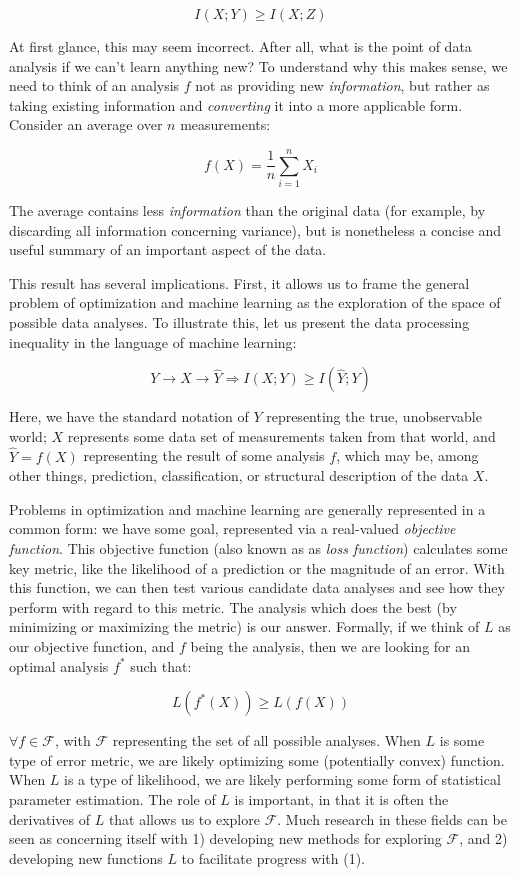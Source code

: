 \documentclass[12pt]{book}
\begin{document}
\[
I(X; Y) \geq I(X; Z)
\]

At first glance, this may seem incorrect.
After all, what is the point of data analysis if we can't learn anything new?
To understand why this makes sense, we need to think of an analysis $f$ not as providing new \textit{information}, but rather as taking existing information and \textit{converting} it into a more applicable form.
Consider an average over $n$ measurements:

\[
f(X) = \frac{1}{n} \sum_{i=1}^n X_i
\]

The average contains less \textit{information} than the original data (for example, by discarding all information concerning variance), but is nonetheless a concise and useful summary of an important aspect of the data.

\bigskip

This result has several implications.
First, it allows us to frame the general problem of optimization and machine learning as the exploration of the space of possible data analyses.
To illustrate this, let us present the data processing inequality in the language of machine learning:

\[
Y \rightarrow X \rightarrow \hat{Y} \Rightarrow I(X; Y) \geq I(\hat{Y}; Y)
\]

Here, we have the standard notation of $Y$ representing the true, unobservable world; $X$ represents some data set of measurements taken from that world, and $\hat{Y} = f(X)$ representing the result of some analysis $f$, which may be, among other things, prediction, classification, or structural description of the data $X$.

Problems in optimization and machine learning are generally represented in a common form: we have some goal, represented via a real-valued \textit{objective function}.
This objective function (also known as as \textit{loss function}) calculates some key metric, like the likelihood of a prediction or the magnitude of an error.
With this function, we can then test various candidate data analyses and see how they perform with regard to this metric.
The analysis which does the best (by minimizing or maximizing the metric) is our answer.
Formally, if we think of $L$ as our objective function, and $f$ being the analysis, then we are looking for an optimal analysis $f^*$ such that:

\[
L(f^*(X)) \geq L(f(X))
\]

$\forall f \in \mathcal{F}$, with $\mathcal{F}$ representing the set of all possible analyses.
When $L$ is some type of error metric, we are likely optimizing some (potentially convex) function.
When $L$ is a type of likelihood, we are likely performing some form of statistical parameter estimation.
The role of $L$ is important, in that it is often the derivatives of $L$ that allows us to explore $\mathcal{F}$.
Much research in these fields can be seen as concerning itself with 1) developing new methods for exploring $\mathcal{F}$, and 2) developing new functions $L$ to facilitate progress with (1).
\end{document}
